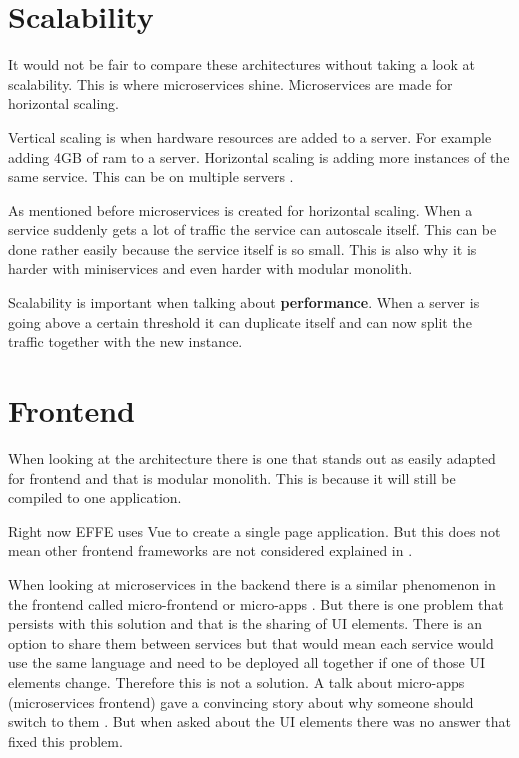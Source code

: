\section{Scalability}
\label{sec:Scalability}

It would not be fair to compare these architectures without taking a look at scalability. This is where microservices shine. Microservices are made for horizontal scaling.

Vertical scaling is when hardware resources are added to a server. For example adding 4GB of ram to a server. Horizontal scaling is adding more instances of the same service. This can be on multiple servers \cite{microservicesMultipleServer}.

As mentioned before microservices is created for horizontal scaling. When a service suddenly gets a lot of traffic the service can autoscale itself. This can be done rather easily because the service itself is so small. This is also why it is harder with miniservices and even harder with modular monolith.

Scalability is important when talking about \textbf{performance}. When a server is going above a certain threshold it can duplicate itself and can now split the traffic together with the new instance.

\section{Frontend}
\label{sec:FrontendComparison}

When looking at the architecture there is one that stands out as easily adapted for frontend and that is modular monolith. This is because it will still be compiled to one application.

Right now EFFE uses Vue to create a single page application. But this does not mean other frontend frameworks are not considered explained in .

When looking at microservices in the backend there is a similar phenomenon in the frontend called micro-frontend or micro-apps \cite{microFrontends}. But there is one problem that persists with this solution and that is the sharing of UI elements. There is an option to share them between services but that would mean each service would use the same language and need to be deployed all together if one of those UI elements change. Therefore this is not a solution. A talk about micro-apps (microservices frontend) gave a convincing story about why someone should switch to them \cite{frontendMicroservices}. But when asked about the UI elements there was no answer that fixed this problem.

